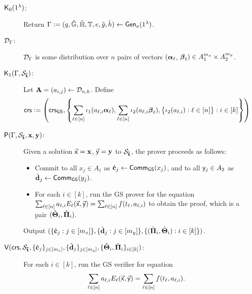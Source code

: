 \begin{description}
\item[$\mathsf{K}_0(1^\lambda)$:]  Return $\Gamma := (q,{\hat{\mathbb{G}}},{\check{\mathbb{H}}},\mathbb{T},e,\hat{g},\check{h}) \leftarrow \mathsf{Gen}_a(1^{\lambda})$.

\item[$\mathcal{D}_\Gamma$:] $\mathcal{D}_\Gamma$ is some distribution over $n$ pairs of vectors  $({\boldsymbol \alpha}_{\ell}$, ${\boldsymbol \beta}_{\ell}) \in A_1^{m_x} \times A_2^{m_y}$.

\item[$\mathsf{K}_1(\Gamma, \mathcal{S}_{\mathbf{\tilde{t}}})$:]
Let $\mathbf{{A}}=(a_{i,j}) \gets \mathcal{D}_{n,k}$. Define 
$$\mathsf{crs}:=\left(\mathsf{crs}_{{\mathsf{GS}}}, \left\{\sum_{\ell\in[n]}\iota_1(a_{\ell,i} {\boldsymbol \alpha}_\ell), \sum_{\ell\in[n]} \iota_2(a_{\ell,i} {\boldsymbol \beta}_\ell), \big\{\iota_{2}(a_{\ell,i}): \ell \in [n]\big\}: i \in [k]\right\}\right)$$
\item[$\mathsf{P}(\Gamma, \mathcal{S}_{\mathbf{\tilde{t}}},\mathbf{x},\mathbf{y})$:] 
Given a solution $\vec{\mathsf{x}}=\mathbf{x}$,  $\vec{\mathsf{y}}=\mathbf{y}$ to $\mathcal{S}_{\mathbf{\tilde{t}}}$, the prover proceeds as follows:
\begin{itemize}
\item Commit to all $x_j \in A_1$ as ${\hat{\mathbf{c}}}_j\gets\mathsf{Comm}_{{\mathsf{GS}}}(x_j)$, and to all 
$\mathsf{y}_j\in A_2$ as $\check{\mathbf{d}}_j\gets\mathsf{Comm}_{{\mathsf{GS}}}(y_j)$.

\item For each $i \in [k]$, run the GS prover for the equation $\sum_{\ell\in[n]} a_{\ell,i} E_{\ell}(\vec{\mathsf{x}},\vec{\mathsf{y}})= \sum_{\ell \in [n]} f(t_{\ell}, a_{\ell,i})$ to obtain the proof, which is a pair  $({\hat{\mathbf{{\Theta}}}}_i,\check{\mathbf{{\Pi}}}_i)$.
\end{itemize}
Output 
$(\{{\hat{\mathbf{c}}}_j : j \in [m_x]\}, \{\check{\mathbf{d}}_j: j \in [m_y]\}, \{(\check{\mathbf{{\Pi}}}_{i},{\hat{\mathbf{{\Theta}}}}_{i}) : i \in [k]\})$.
\item[$\mathsf{V}(\mathsf{crs},\mathcal{S}_{\mathbf{\tilde{t}}},\{{\hat{\mathbf{c}}}_j\}_{j\in[m_x]}, \{\check{\mathbf{d}}_j\}_{j\in[m_y]}, \{{\hat{\mathbf{{\Theta}}}}_{i},\check{\mathbf{{\Pi}}}_{i}\}_{i \in [k]})$:] For each $i \in [k]$, run the GS verifier for equation
$$\sum_{\ell\in[n]} a_{\ell,i} E_{\ell}(\vec{\mathsf{x}},\vec{\mathsf{y}})= \sum_{\ell \in [n]} f(t_{\ell}, a_{\ell,i}).$$
\end{description}  

